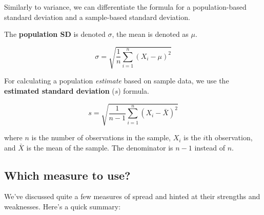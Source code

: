 \documentclass[
  11pt,
]{book}
\theoremstyle{definition}
\theoremstyle{definition}
\theoremstyle{definition}
\theoremstyle{definition}
\theoremstyle{remark}
\begin{document}
\hypertarget{calloutSD}{}
\begin{callout}

Similarly to variance, we can differentiate the formula for a population-based standard deviation and a sample-based standard deviation.

The \textbf{population SD} is denoted \(\sigma\), the mean is denoted as \(\mu\).

\[
\sigma = \sqrt{ \frac{1}{n} \sum_{i=1}^n \left( X_i - \mu \right)^2 }
\]

For calculating a population \emph{estimate} based on sample data, we use the \textbf{estimated standard deviation} (\(s\)) formula.

\[
s = \sqrt{ \frac{1}{n-1} \sum_{i=1}^n \left( X_i - \bar{X} \right)^2 }
\]

where \(n\) is the number of observations in the sample, \(X_i\) is the \(i\)th observation, and \(\bar{X}\) is the mean of the sample. The denominator is \(n-1\) instead of \(n\).

\end{callout}

\hypertarget{which-measure-to-use}{%
\subsection{Which measure to use?}\label{which-measure-to-use}}

We've discussed quite a few measures of spread and hinted at their strengths and weaknesses. Here's a quick summary:
\end{document}
